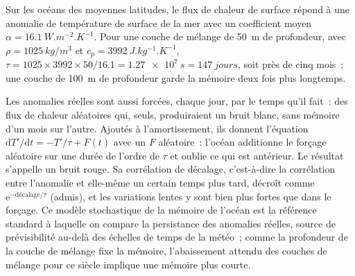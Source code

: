 \begin{example}\label{ex:b2:climate-variability:tau}
Sur les océans des moyennes latitudes, le flux de chaleur de surface répond à une anomalie de température de surface de la mer
avec un coefficient moyen $\alpha = \qty{16.1}{W.m^{-2}.K^{-1}}$. Pour une couche de mélange de \qty{50}{m} de profondeur,
avec $\rho = \qty{1025}{kg/m^3}$ et $c_p = \qty{3992}{J.kg^{-1}.K^{-1}}$,
$\tau = 1025 \times 3992 \times 50/16.1 = \qty{1.27e7}{s} = \qty{147}{jours}$, soit près de cinq mois~;
une couche de \qty{100}{m} de profondeur garde la mémoire deux fois plus longtemps.
\end{example}

Les anomalies réelles sont aussi forcées, chaque jour, par le temps qu'il fait~: des flux de chaleur aléatoires qui, seuls,
produiraient un bruit blanc, sans mémoire d'un mois sur l'autre. Ajoutés à l'amortissement, ils donnent l'équation
$\mathrm{d}T'/\mathrm{d}t = -T'/\tau + F(t)$ avec un $F$ aléatoire~: l'océan additionne le forçage aléatoire sur une
durée de l'ordre de $\tau$ et oublie ce qui est antérieur. Le résultat s'appelle un bruit rouge. Sa corrélation de décalage,
c'est-à-dire la corrélation entre l'anomalie et elle-même un certain temps plus tard, décroît comme
$\mathrm{e}^{-\text{décalage}/\tau}$ (admis), et les variations lentes y sont
bien plus fortes que dans le forçage.
Ce modèle stochastique de la mémoire de l'océan est la référence standard à laquelle on compare la persistance des
anomalies réelles, source de prévisibilité au-delà des échelles de temps de la météo~; comme la profondeur de la couche
de mélange fixe la mémoire, l'abaissement attendu des couches de mélange pour ce siècle implique une mémoire plus courte.

